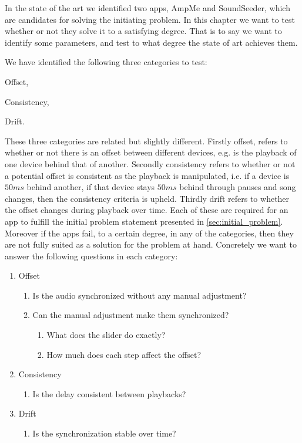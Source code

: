 In the state of the art we identified two apps, AmpMe and SoundSeeder, which are candidates for solving the initiating problem. 
In this chapter we want to test whether or not they solve it to a satisfying degree. 
That is to say we want to identify some parameters, and test to what degree the state of art achieves them.

We have identified the following three categories to test:
\begin{enumerate*}[label=(\alph*)]
    \item Offset,
    \item Consistency,
    \item Drift.
\end{enumerate*}

These three categories are related but slightly different. 
Firstly offset, refers to whether or not there is an offset between different devices, e.g. is the playback of one device behind that of another.
Secondly consistency refers to whether or not a potential offset is consistent as the playback is manipulated, i.e. if a device is $50 ms$ behind another, if that device stays $50 ms$ behind through pauses and song changes, then the consistency criteria is upheld.
Thirdly drift refers to whether the offset changes during playback over time.
Each of these are required for an app to fulfill the initial problem statement presented in \vref{sec:initial_problem}.
Moreover if the apps fail, to a certain degree, in any of the categories, then they are not fully suited as a solution for the problem at hand. 
Concretely we want to answer the following questions in each category:
\begin{enumerate}[label=(\alph*)]
    \item Offset
    \begin{enumerate}[label=(\arabic*)]
        \item Is the audio synchronized without any manual adjustment?
        \item Can the manual adjustment make them synchronized?
        \begin{enumerate}
            \item What does the slider do exactly?
            \item How much does each step affect the offset?
        \end{enumerate}
    \end{enumerate} 
    \item Consistency
    \begin{enumerate}[start=3,label=(\arabic*)]
        \item Is the delay consistent between playbacks?
    \end{enumerate}
    \item Drift
    \begin{enumerate}[start=4,label=(\arabic*)]
        \item Is the synchronization stable over time?
    \end{enumerate}
\end{enumerate}
